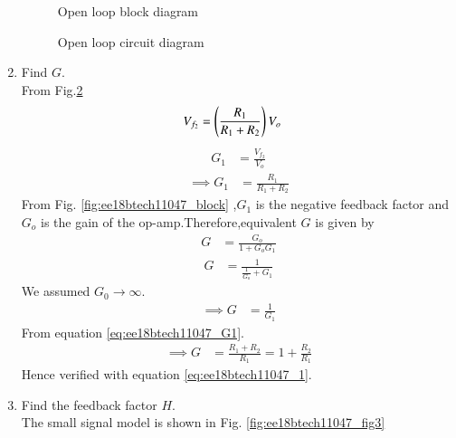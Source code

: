 \begin{enumerate}[label=\arabic*.,ref=\theenumi]
\renewcommand{\thefigure}{\theenumi.\arabic{figure}}
%
\begin{figure}[!ht]
	\begin{center}
		\resizebox{\columnwidth}{!}{}
	\end{center}
\caption{Open loop block diagram}
\label{fig:ee18btech11047_fig6}
\end{figure}
%
\begin{figure}[!ht]
	\begin{center}
		\resizebox{\columnwidth}{!}{}
	\end{center}
\caption{Open loop circuit diagram}
\label{fig:ee18btech11047_fig7}
\end{figure}
\renewcommand{\thefigure}{\theenumi}
%
\item Find $G$.
\\
\solution 
From Fig.\ref{fig:ee18btech11047_fig7}
\begin{align}
V_{f_{2}} &= \left(\frac{R_{1}}{R_{1} + R_{2}}\right)V_{o}
\end{align}
\begin{align}
G_{1} &= \frac{V_{f_{2}}}{V_{o}}
\end{align}
\begin{align}
\label{eq:ee18btech11047_G1}
\implies G_{1} &= \frac{R_{1}}{R_{1} + R_{2}}
\end{align}
From Fig. \ref{fig:ee18btech11047_block} ,$G_{1}$ is the negative feedback factor and $G_{o}$ is the gain of the op-amp.Therefore,equivalent $G$ is given by
\begin{align}
G &= \frac{G_{o}}{1+G_{o}G_{1}}
\end{align}
\begin{align}
G  &= \frac{1}{\frac{1}{G_{o}} + G_{1}}
\end{align}
We assumed $G_{0}\to\infty$. 
\begin{align}
\implies G&=\frac{1}{G_{1}}
\end{align}
From equation \eqref{eq:ee18btech11047_G1}.
\begin{align}
\implies G &= \frac{R_{1}+R_{2}}{R_{1}}=1+\frac{R_{2}}{R_{1}}
\end{align}
Hence verified with equation \eqref{eq:ee18btech11047_1}.
\item Find the feedback factor $H$. \\
\label{prob:ee18btech11047_H}
\solution The small signal model is shown in Fig. \ref{fig:ee18btech11047_fig3}

\end{enumerate}
